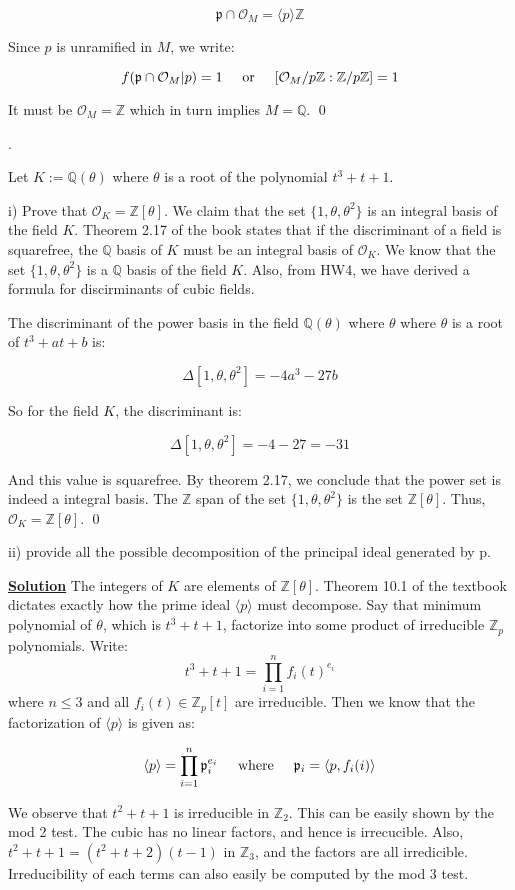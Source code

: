 \documentclass{article}
\newcommand{\new}[1]{
    \vspace{2mm}
    \noindent
    \textbf{
    \underline{#1}}
}
\def\ZZ{{\mathbb{Z}}}
\newcounter{problemcnt}
\newcommand{\Problem}{{
    \vspace{5mm}
    \stepcounter{problemcnt}
    \noindent
    \arabic{problemcnt}. 
}
}
\newcommand{\textOr}{
    \hspace{5mm}
    \textrm{or}
    \hspace{5mm}
}
\newcommand{\textWhere}{
    \hspace{5mm}
    \textrm{where}
    \hspace{5mm}
}
\newcommand{\<}{{{
    \langle
}}}
\def\>{{{
    \rangle
}}}
\def\ZZ{{\mathbb{Z}}}
\newcommand{\ringInt}{
    {\mathcal{O}}
}
\newcommand{\pideal}{
    {{\mathfrak{p}}}
}
\def\QQ{\mathbb{Q}}
\begin{document}
\[
    \pideal \cap \ringInt_M = \<p\>\ZZ
\]

Since $p$ is unramified in $M$, we write:

\[
    f( \pideal \cap \ringInt_M|p) = 1
    \textOr
    [\ringInt_M/p\ZZ : \ZZ/p\ZZ] = 1
\]

It must be $\ringInt_M = \ZZ$ which in turn implies 
$M = \QQ$. \qed

\Problem 
Let $K := \QQ(\theta)$ where $\theta$ is a root of the polynomial 
$t^3 + t + 1$. 

i) Prove that $\ringInt_K = \ZZ[\theta]$. 
We claim that the set $\{1, \theta, \theta^2\}$ is an integral basis 
of the field $K$. Theorem 2.17 of the book states that if the 
discriminant of a field is squarefree, the $\QQ$ basis of $K$ 
must be an integral basis of $\ringInt_K$. We know that the set 
$\{1, \theta, \theta^2\}$ is a $\QQ$ basis of the field $K$. Also, 
from HW4, we have derived a formula for discirminants of cubic fields. 

The discriminant of the power basis in the field $\QQ(\theta)$ where $\theta$ where 
$\theta$ is a root of $t^3+at+b$ is:

\[
    \Delta [1, \theta, \theta^2] = -4a^3 - 27b
\]

So for the field $K$, the discriminant is:

\[
    \Delta[1, \theta, \theta^2] = -4-27 = -31
\]

And this value is squarefree. By theorem 2.17, we conclude that 
the power set is indeed a integral basis. The $\ZZ$ span of the 
set  $\{1, \theta, \theta^2\}$ is the set $\ZZ[\theta]$. Thus, 
$\ringInt_K = \ZZ[\theta]$. \qed

ii) provide all the possible decomposition of the principal 
ideal generated by p. 

\new{Solution} The integers of $K$ are elements of $\ZZ[\theta]$. 
Theorem 10.1 of the textbook dictates exactly how the prime ideal 
$\<p\>$ must decompose. Say that minimum polynomial of $\theta$, which 
is $t^3+t+1$, factorize into some product of irreducible $\ZZ_p$ polynomials. 
Write:
\[
    t^3+t+1 = \prod_{i = 1}^{n} f_i(t)^{e_i}
\]
where $n \leq 3$ and all $f_i(t) \in \ZZ_p[t]$ are irreducible. 
Then we know that the factorization of $\<p\>$ is given as:

\[
    \<p\> = \prod_{i = 1}^{n} \pideal_i^{e_i}
\textWhere \pideal_i = \<p, f_i(i)\>
\]

We observe that $t^2 + t + 1$ is irreducible in $\ZZ_2$.
This can be easily shown by the mod 2 test. The cubic 
has no linear factors, and hence is irrecucible.  
Also, $t^2+t+1 = (t^2+t+2)(t-1)$ in $\ZZ_3$, and the 
factors are all irredicible. Irreducibility of 
each terms can also easily be computed by the mod 3 test. 
\end{document}
